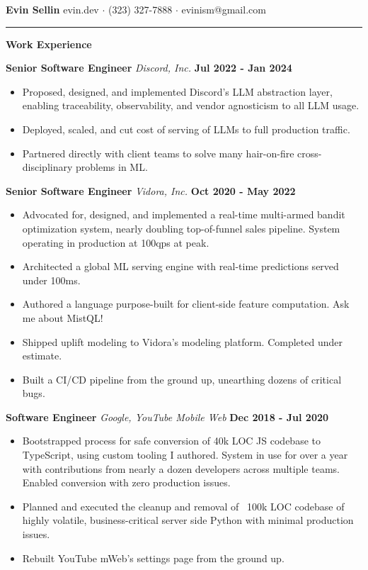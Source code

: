 \documentclass[10pt]{letter}
\begin{document}
\textbf{Evin Sellin}
\hfill
evin.dev $\cdot$ (323) 327-7888 $\cdot$ evinism@gmail.com
\vspace{4px}
\hrule
\textbf{Work Experience}

\hspace*{2px}
\textbf{Senior Software Engineer}
\textit{Discord, Inc.}
\hfill 
\textbf{Jul 2022 - Jan 2024}
\begin{itemize}
  \item Proposed, designed, and implemented Discord's LLM abstraction layer, enabling traceability, observability, and vendor agnosticism to all LLM usage.
  \item Deployed, scaled, and cut cost of serving of LLMs to full production traffic.
  \item Partnered directly with client teams to solve many hair-on-fire cross-disciplinary problems in ML.
\end{itemize}

\hspace*{2px}
\textbf{Senior Software Engineer} 
\textit{Vidora, Inc.}
\hfill 
\textbf{Oct 2020 - May 2022}
\begin{itemize}
  \item Advocated for, designed, and implemented a real-time multi-armed bandit optimization system, nearly doubling top-of-funnel sales pipeline. System operating in production at 100qps at peak.
  \item Architected a global ML serving engine with real-time predictions served under 100ms.
  \item Authored a language purpose-built for client-side feature computation. Ask me about MistQL!
  \item Shipped uplift modeling to Vidora's modeling platform. Completed under estimate.
  \item Built a CI/CD pipeline from the ground up, unearthing dozens of critical bugs.
\end{itemize}

\hspace*{2px}
\textbf{Software Engineer} 
\textit{Google, YouTube Mobile Web}
\hfill 
\textbf{Dec 2018 - Jul 2020}
\begin{itemize}
  \item Bootstrapped process for safe conversion of 40k LOC JS codebase to TypeScript, using custom tooling I authored. System in use for over a year with contributions from nearly a dozen developers across multiple teams. Enabled conversion with zero production issues.
  \item Planned and executed the cleanup and removal of ~100k LOC codebase of highly volatile, business-critical server side Python with minimal production issues.
  \item Rebuilt YouTube mWeb's settings page from the ground up.
\end{itemize}
\end{document}
